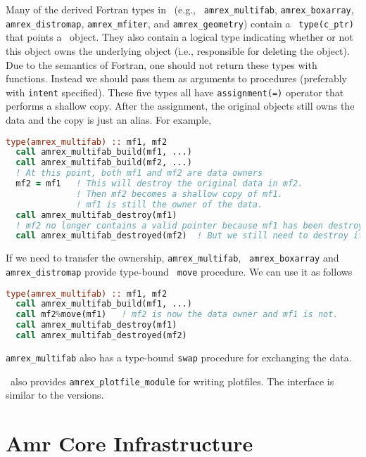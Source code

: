 {Many of the derived Fortran types in \amrex\ (e.g., {\tt
  amrex\_multifab}, {\tt amrex\_boxarray}, {\tt amrex\_distromap},
{\tt amrex\_mfiter}, and {\tt amrex\_geometry}) contain a {\tt
  type(c\_ptr)} that points a \cpp\ object.  They also contain a
logical type indicating whether or not this object owns the underlying
object (i.e., responsible for deleting the object).  Due to the
semantics of Fortran, one should not return these types with
functions.  Instead we should pass them as arguments to procedures
(preferably with {\tt intent} specified).  These five types all have
{\tt assignment(=)} operator that performs a shallow copy.  After the
assignment, the original objects still owns the data and the copy is
just an alias.  For example,
\begin{lstlisting}[language=fortran]
  type(amrex_multifab) :: mf1, mf2
  call amrex_multifab_build(mf1, ...)
  call amrex_multifab_build(mf2, ...)
  ! At this point, both mf1 and mf2 are data owners
  mf2 = mf1   ! This will destroy the original data in mf2.
              ! Then mf2 becomes a shallow copy of mf1.
              ! mf1 is still the owner of the data.
  call amrex_multifab_destroy(mf1)
  ! mf2 no longer contains a valid pointer because mf1 has been destroyed. 
  call amrex_multifab_destroyed(mf2)  ! But we still need to destroy it.
\end{lstlisting}
If we need to transfer the ownership, {\tt amrex\_multifab}, {\tt
  amrex\_boxarray} and {\tt amrex\_distromap} provide type-bound {\tt
  move} procedure.  We can use it as follows
\begin{lstlisting}[language=fortran]
  type(amrex_multifab) :: mf1, mf2
  call amrex_multifab_build(mf1, ...)
  call mf2%move(mf1)   ! mf2 is now the data owner and mf1 is not.
  call amrex_multifab_destroy(mf1)
  call amrex_multifab_destroyed(mf2)
\end{lstlisting}
{\tt amrex\_multifab} also has a type-bound {\tt swap} procedure for
exchanging the data.

\amrex\ also provides {\tt amrex\_plotfile\_module} for writing
plotfiles.  The interface is similar to the \cpp versions.

\section{Amr Core Infrastructure}
\label{sec:fi:amrcore}

}
